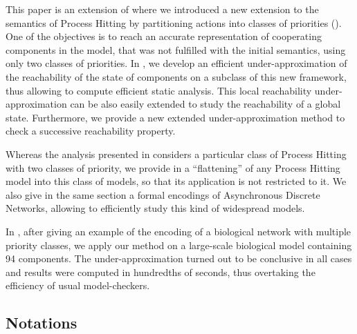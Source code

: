 This paper is an extension of \cite{FPMR13-CS2Bio} where we
introduced a new extension to the semantics of Process Hitting by partitioning actions into classes of priorities
().
One of the objectives is to reach an accurate representation of cooperating components in the model, that was not fulfilled with the initial semantics, using only two classes of priorities.
In ,
we develop an efficient under-approximation of the reachability of the state of components on a subclass of this new framework, thus allowing to compute efficient static analysis.
This local reachability under-approximation can be also easily extended to study the reachability of a global state.
Furthermore, we provide a new extended under-approximation method to check a successive reachability property.

Whereas the analysis presented in  considers a particular class of
Process Hitting with two classes of priority,
we provide in  a “flattening” of any Process Hitting model into
this class of models,
so that its application is not restricted to it.
We also give in the same section a formal encodings of Asynchronous Discrete Networks,
allowing to efficiently study this kind of widespread models.

In , after giving an example of the encoding of a biological
network with multiple priority classes,
we apply our method on a large-scale biological model containing 94 components.
The under-approximation turned out to be conclusive in all cases and results were computed in hundredths of seconds,
thus overtaking the efficiency of usual model-checkers.




\subsection*{Notations}
\label{notations}

